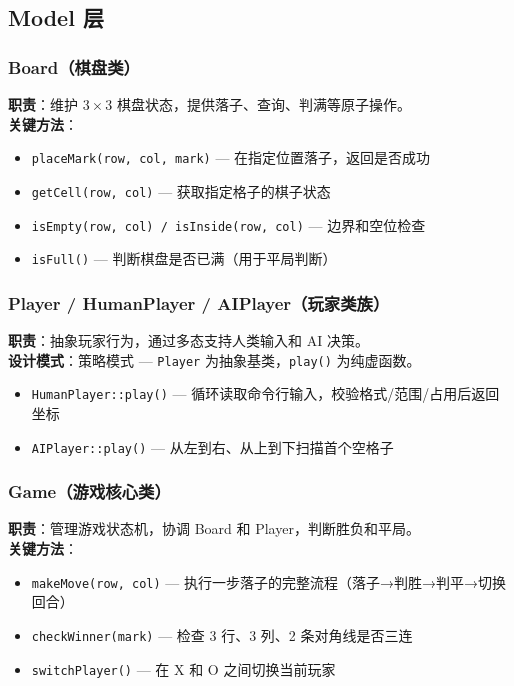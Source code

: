 \documentclass[12pt,a4paper]{ctexart}
\begin{document}
\subsection{Model 层}

\subsubsection{Board（棋盘类）}
\textbf{职责}：维护 $3\times 3$ 棋盘状态，提供落子、查询、判满等原子操作。\\
\textbf{关键方法}：
\begin{itemize}[itemsep=2pt]
    \item \texttt{placeMark(row, col, mark)} — 在指定位置落子，返回是否成功
    \item \texttt{getCell(row, col)} — 获取指定格子的棋子状态
    \item \texttt{isEmpty(row, col) / isInside(row, col)} — 边界和空位检查
    \item \texttt{isFull()} — 判断棋盘是否已满（用于平局判断）
\end{itemize}

\subsubsection{Player / HumanPlayer / AIPlayer（玩家类族）}
\textbf{职责}：抽象玩家行为，通过多态支持人类输入和 AI 决策。\\
\textbf{设计模式}：策略模式 — \texttt{Player} 为抽象基类，\texttt{play()} 为纯虚函数。
\begin{itemize}[itemsep=2pt]
    \item \texttt{HumanPlayer::play()} — 循环读取命令行输入，校验格式/范围/占用后返回坐标
    \item \texttt{AIPlayer::play()} — 从左到右、从上到下扫描首个空格子
\end{itemize}

\subsubsection{Game（游戏核心类）}
\textbf{职责}：管理游戏状态机，协调 Board 和 Player，判断胜负和平局。\\
\textbf{关键方法}：
\begin{itemize}[itemsep=2pt]
    \item \texttt{makeMove(row, col)} — 执行一步落子的完整流程（落子→判胜→判平→切换回合）
    \item \texttt{checkWinner(mark)} — 检查 3 行、3 列、2 条对角线是否三连
    \item \texttt{switchPlayer()} — 在 X 和 O 之间切换当前玩家
\end{itemize}
\end{document}
